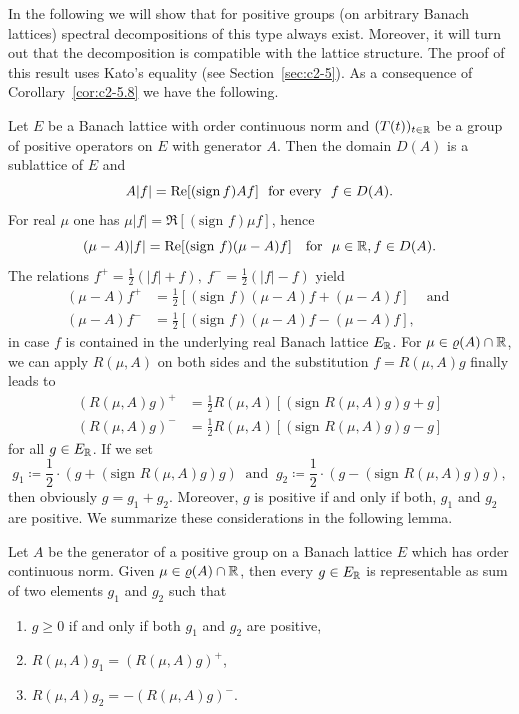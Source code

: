 In the following we will show that for positive groups (on arbitrary Banach
lattices) spectral decompositions of this type always exist. 
Moreover,
it will turn out that the decomposition is compatible with the lattice
structure. 
The proof of this result uses Kato's equality (see Section~\ref{sec:c2-5}).%
As a consequence of Corollary~\ref{cor:c2-5.8}  we have the following.

Let $E$ be a Banach lattice with order continuous norm and $(T(t))_{t \in \R }$
be a group of positive operators on $E$ with generator $A$.
Then the domain $D(A)$ is a sublattice of\/ $E$ and
\begin{equation}\label{eq:c3-4.8}
	A|f| = \Re [(\text{sign\,} f)Af] \ \text{ for every } \ f \in D(A) . 
\end{equation}
For real $\mu$ one has $\mu|f| = \Re [(\text{sign } f)\mu f]$, hence
\[
(\mu - A)|f| = \Re[(\text{sign } f)(\mu - A)f] \ \ \text{ for } \ \mu \in \R , f \in D(A) .
\]
The relations $f^+ = \frac{1}{2}(|f| + f), \ f^- = \frac{1}{2}(|f| - f)$ yield
\begin{align*}
(\mu - A)f^+ &= \frac{1}{2}[(\text{sign } f)(\mu - A)f + (\mu - A)f] \quad\ \text{and }\\
(\mu - A)f^- &= \frac{1}{2}[(\text{sign } f)(\mu - A)f - (\mu - A)f] , 
\end{align*}
in case $f$ is contained in the underlying real Banach lattice $E_{\R }$.
For $\mu \in \rho(A) \cap \R $, we can apply $R(\mu,A)$ on both sides and the substitution $f = R(\mu,A)g$ finally leads to
\begin{equation}\label{eq:c3-4.9}
	\begin{split}
	(R(\mu,A)g)^+ &= \frac{1}{2}R(\mu,A) [(\text{sign } R(\mu,A)g)g + g] \\
	(R(\mu,A)g)^- &= \frac{1}{2}R(\mu,A) [(\text{sign } R(\mu,A)g)g - g]
	\end{split}
\end{equation}
for all $g \in E_{\R }$. 
If we set
\[ 
g_1 \coloneq \frac{1}{2}\cdot(g + (\text{sign } R(\mu,A)g)g) \ \text{ and } \ 
g_2 \coloneq \frac{1}{2}\cdot(g - (\text{sign } R(\mu,A)g)g) , 
\]
then obviously $g = g_1 + g_2$. Moreover, $g$ is positive if and only if
both, $g_1$ and $g_2$ are positive. We summarize these considerations in the following lemma.
\begin{lemma}\label{lem:c3-4.6}
Let $A$ be the generator of a positive group on a Banach
lattice $E$ which has order continuous norm. Given $\mu \in \rho(A) \cap \R $, then
every $g \in E_{\R }$ is representable as sum of two elements $g_1$ and $g_2$
such that
\begin{enumerate}[\upshape (i)]
	\item 
	$g \geq 0$ if and only if both $g_1$ and $g_2$ are positive,
	
	\item
	$R(\mu,A)g_1 = (R(\mu,A)g)^+$, 

	\item
	$R(\mu,A)g_2 = -(R(\mu,A)g)^-$. 
\end{enumerate}	
\end{lemma}
